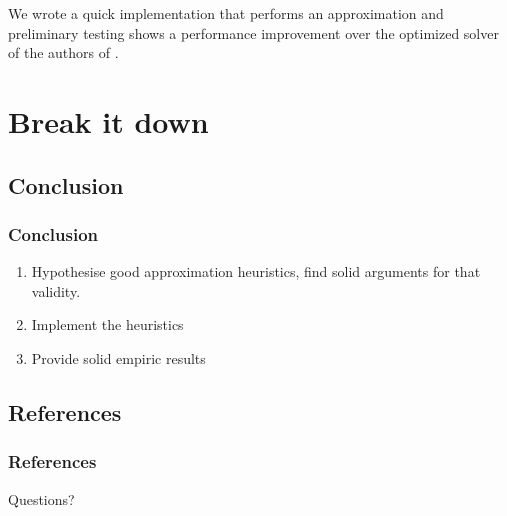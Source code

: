 \documentclass{beamer}
\begin{document}
	\begin{frame}
		We wrote a quick implementation that performs an approximation and preliminary testing shows
		a performance improvement over the optimized solver of the authors of
		\cite{devriendt2012symmetry}.
	\end{frame}

\section{Break it down}

	\subsection{Conclusion}
	\begin{frame}
		\frametitle{Conclusion}
		\begin{enumerate}
			\item<1->	Hypothesise good approximation heuristics, find solid arguments for that
						validity.
			\item<2->	Implement the heuristics
			\item<3->	Provide solid empiric results
		\end{enumerate}
	\end{frame}

	\subsection{References}
	\begin{frame}[allowframebreaks]
		\frametitle{References}
		
		
	\end{frame}

	\begin{frame}
	\Huge{\centerline{Questions?}}
	\end{frame}
\end{document}
